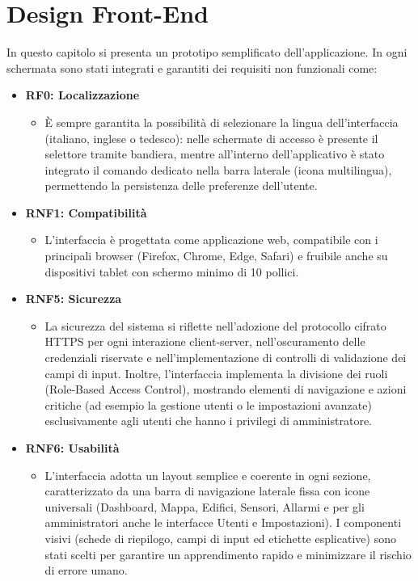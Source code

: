 \section{Design Front-End}
In questo capitolo si presenta un prototipo semplificato dell'applicazione. In ogni schermata sono stati integrati e garantiti dei requisiti non funzionali come:
\begin{itemize}
    \item \textbf{RF0: Localizzazione}
    \begin{itemize}
        \item È sempre garantita la possibilità di selezionare la lingua dell'interfaccia (italiano, inglese o tedesco): nelle schermate di accesso è presente il selettore tramite bandiera, mentre all'interno dell'applicativo è stato integrato il comando dedicato nella barra laterale (icona multilingua), permettendo la persistenza delle preferenze dell'utente.
    \end{itemize}
    \item \textbf{RNF1: Compatibilità}
    \begin{itemize}
        \item L'interfaccia è progettata come applicazione web, compatibile con i principali browser (Firefox, Chrome, Edge, Safari) e fruibile anche su dispositivi tablet con schermo minimo di 10 pollici.
    \end{itemize}

    \item \textbf{RNF5: Sicurezza}
    \begin{itemize}
        \item La sicurezza del sistema si riflette nell'adozione del protocollo cifrato HTTPS per ogni interazione client-server, nell'oscuramento delle credenziali riservate e nell'implementazione di controlli di validazione dei campi di input. Inoltre, l'interfaccia implementa la divisione dei ruoli (Role-Based Access Control), mostrando elementi di navigazione e azioni critiche (ad esempio la gestione utenti o le impostazioni avanzate) esclusivamente agli utenti che hanno i privilegi di amministratore.
    \end{itemize}
    
    \item \textbf{RNF6: Usabilità}
    \begin{itemize}
        \item L'interfaccia adotta un layout semplice e coerente in ogni sezione, caratterizzato da una barra di navigazione laterale fissa con icone universali (Dashboard, Mappa, Edifici, Sensori, Allarmi e per gli amministratori anche le interfacce Utenti e Impostazioni). I componenti visivi (schede di riepilogo, campi di input ed etichette esplicative) sono stati scelti per garantire un apprendimento rapido e minimizzare il rischio di errore umano.
    \end{itemize}


\end{itemize}
